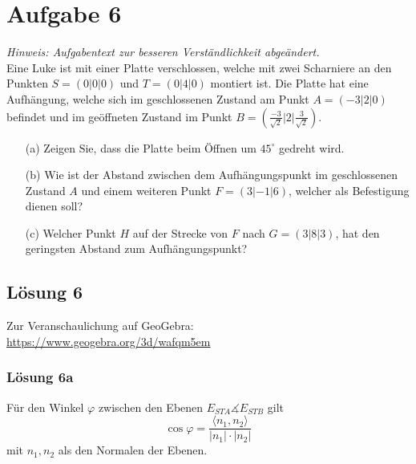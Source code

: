\documentclass[main.tex]{subfiles}
\begin{document}
\section{Aufgabe 6}
\textit{Hinweis: Aufgabentext zur besseren Verständlichkeit abgeändert.}\\

Eine Luke ist mit einer Platte verschlossen, welche mit zwei Scharniere an den Punkten $S = (0|0|0)$ und $T = (0|4|0)$ montiert ist.
Die Platte hat eine Aufhängung, welche sich im geschlossenen Zustand am Punkt $A = (-3|2|0)$ befindet und im geöffneten Zustand im Punkt $B = (\frac{-3}{\sqrt{2}}|2|\frac{3}{\sqrt{2}})$.

\begin{enumerate}
    \item[(a)] Zeigen Sie, dass die Platte beim Öffnen um $45^{\circ}$ gedreht wird.
    \item[(b)] Wie ist der Abstand zwischen dem Aufhängungspunkt im geschlossenen Zustand $A$ und einem weiteren Punkt $F = (3|-1|6)$, welcher als Befestigung dienen soll?
    \item[(c)] Welcher Punkt $H$ auf der Strecke von $F$ nach $G = (3|8|3)$, hat den geringsten Abstand zum Aufhängungspunkt?
\end{enumerate}

\subsection{Lösung 6}

Zur Veranschaulichung auf GeoGebra:\\
\href{https://www.geogebra.org/3d/wafqm5em}{https://www.geogebra.org/3d/wafqm5em}

\subsubsection{Lösung 6a}
Für den Winkel $\varphi $ zwischen den Ebenen $E_{STA} \measuredangle E_{STB}$ gilt
\begin{equation*}
\cos \varphi =\frac{\langle n_{1} ,n_{2}\rangle }{| n_{1}| \cdotp | n_{2}| }
\end{equation*}
mit $n_{1} ,n_{2}$ als den Normalen der Ebenen.
\end{document}
